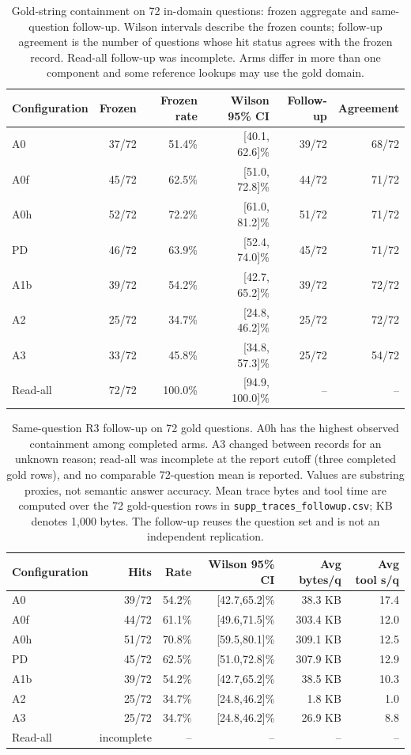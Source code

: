 \begin{table}[t]
\centering\small
\caption{Gold-string containment on 72 in-domain questions: frozen aggregate and same-question follow-up. Wilson intervals describe the frozen counts; follow-up agreement is the number of questions whose hit status agrees with the frozen record. Read-all follow-up was incomplete. Arms differ in more than one component and some reference lookups may use the gold domain.}
\label{tab:s-arm-data}
\begin{tabular}{lrrrrr}
\toprule
Configuration & Frozen & Frozen rate & Wilson 95\% CI & Follow-up & Agreement \\
\midrule
A0 & 37/72 & 51.4\% & [40.1, 62.6]\% & 39/72 & 68/72 \\
A0f & 45/72 & 62.5\% & [51.0, 72.8]\% & 44/72 & 71/72 \\
A0h & 52/72 & 72.2\% & [61.0, 81.2]\% & 51/72 & 71/72 \\
PD & 46/72 & 63.9\% & [52.4, 74.0]\% & 45/72 & 71/72 \\
A1b & 39/72 & 54.2\% & [42.7, 65.2]\% & 39/72 & 72/72 \\
A2 & 25/72 & 34.7\% & [24.8, 46.2]\% & 25/72 & 72/72 \\
A3 & 33/72 & 45.8\% & [34.8, 57.3]\% & 25/72 & 54/72 \\
Read-all & 72/72 & 100.0\% & [94.9, 100.0]\% & -- & -- \\
\bottomrule
\end{tabular}
\end{table}
\begin{table}[t]
\centering\small
\caption{Same-question R3 follow-up on 72 gold questions. A0h has the highest
observed containment among completed arms. A3 changed between records for an
unknown reason; read-all was incomplete at the report cutoff (three
completed gold rows), and no comparable 72-question mean is reported. Values are
substring proxies, not semantic answer accuracy. Mean trace bytes and tool
time are computed over the 72 gold-question rows in \texttt{supp\_traces\_followup.csv};
KB denotes 1,000 bytes. The follow-up reuses the question set and is not an
independent replication.}
\label{tab:s-r3-content}
\begin{tabular}{lrrrrr}
\toprule
Configuration & Hits & Rate & Wilson 95\% CI & Avg bytes/q & Avg tool s/q \\
\midrule
A0 & 39/72 & 54.2\% & [42.7,65.2]\% & 38.3 KB & 17.4 \\
A0f & 44/72 & 61.1\% & [49.6,71.5]\% & 303.4 KB & 12.0 \\
A0h & 51/72 & 70.8\% & [59.5,80.1]\% & 309.1 KB & 12.5 \\
PD & 45/72 & 62.5\% & [51.0,72.8]\% & 307.9 KB & 12.9 \\
A1b & 39/72 & 54.2\% & [42.7,65.2]\% & 38.5 KB & 10.3 \\
A2 & 25/72 & 34.7\% & [24.8,46.2]\% & 1.8 KB & 1.0 \\
A3 & 25/72 & 34.7\% & [24.8,46.2]\% & 26.9 KB & 8.8 \\
Read-all & incomplete & -- & -- & -- & -- \\
\bottomrule
\end{tabular}
\end{table}
